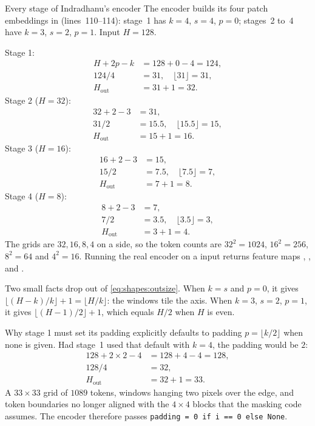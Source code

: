 \begin{worked}[label={we:shapes:stages}]{Every stage of Indradhanu's encoder}
The encoder builds its four patch embeddings in
 (lines~110--114):
stage~1 has $k=4$, $s=4$, $p=0$; stages~2 to~4 have $k=3$, $s=2$, $p=1$. Input $H=128$.

Stage 1:
\begin{align*}
H + 2p - k &= 128 + 0 - 4 = 124,\\
124 / 4 &= 31, \quad \lfloor 31 \rfloor = 31,\\
H_{\text{out}} &= 31 + 1 = 32.
\end{align*}
Stage 2 ($H=32$):
\begin{align*}
32 + 2 - 3 &= 31,\\
31 / 2 &= 15.5, \quad \lfloor 15.5\rfloor = 15,\\
H_{\text{out}} &= 15 + 1 = 16.
\end{align*}
Stage 3 ($H=16$):
\begin{align*}
16 + 2 - 3 &= 15,\\
15/2 &= 7.5, \quad \lfloor 7.5 \rfloor = 7,\\
H_{\text{out}} &= 7 + 1 = 8.
\end{align*}
Stage 4 ($H=8$):
\begin{align*}
8 + 2 - 3 &= 7,\\
7/2 &= 3.5,\quad \lfloor 3.5\rfloor = 3,\\
H_{\text{out}} &= 3 + 1 = 4.
\end{align*}
The grids are $32, 16, 8, 4$ on a side, so the token counts are $32^2 = 1024$, $16^2 = 256$,
$8^2 = 64$ and $4^2 = 16$. Running the real encoder on a  input returns
feature maps , ,  and
\tagC.
\end{worked}

Two small facts drop out of \cref{eq:shapes:outsize}. When $k = s$ and $p = 0$, it gives
$\lfloor (H-k)/k\rfloor + 1 = \lfloor H/k \rfloor$: the windows tile the axis. When $k=3$, $s=2$,
$p=1$, it gives $\lfloor (H-1)/2 \rfloor + 1$, which equals $H/2$ when $H$ is even.

\begin{worked}[label={we:shapes:pad}]{Why stage 1 must set its padding explicitly}
 defaults to padding $p = \lfloor k/2 \rfloor$ when none is given. Had stage~1
used that default with $k=4$, the padding would be $2$:
\begin{align*}
128 + 2\times2 - 4 &= 128 + 4 - 4 = 128,\\
128 / 4 &= 32,\\
H_{\text{out}} &= 32 + 1 = 33.
\end{align*}
A $33\times33$ grid of $1089$ tokens, windows hanging two pixels over the edge, and token boundaries
no longer aligned with the $4\times4$ blocks that the masking code assumes. The encoder therefore
passes \lstinline!padding = 0 if i == 0 else None!.
\end{worked}

